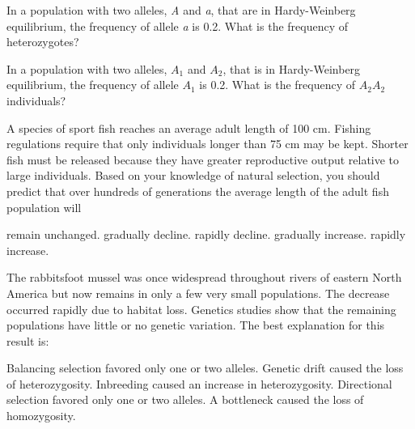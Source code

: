 \question
In a population with two alleles, \textit{A} and \textit{a}, that are in Hardy-Weinberg equilibrium, the frequency of allele \textit{a} is 0.2. What is the frequency of heterozygotes? 

\begin{choices}
\end{choices}

\question
In a population with two alleles, $A_1$ and $A_2$, that is in Hardy-Weinberg equilibrium, the frequency of allele $A_1$ is 0.2. What is the frequency of $A_2A_2$ individuals? 

\begin{choices}
\end{choices}

\question
A species of sport fish reaches an average adult length of 100 cm. Fishing regulations require that only individuals longer than 75 cm may be kept. Shorter fish must be released because they have greater reproductive output relative to large individuals. Based on your knowledge of natural selection, you should predict that over hundreds of generations the average length of the adult fish population will

\begin{choices}
\correctchoice remain unchanged. %
\choice gradually decline. %
\choice rapidly decline. %
\choice gradually increase. %
\choice rapidly increase. %
\end{choices}

\question
The rabbitsfoot mussel was once widespread throughout rivers of eastern North America but now remains in only a few very small populations. The decrease occurred rapidly due to habitat loss. Genetics studies show that the remaining populations have little or no genetic variation. The best explanation for this result is:

\begin{choices}
\choice Balancing selection favored only one or two alleles. %
\correctchoice Genetic drift caused the loss of heterozygosity. %
\choice Inbreeding caused an increase in heterozygosity. %
\choice Directional selection favored only one or two alleles. %
\choice A bottleneck caused the loss of homozygosity. %
\end{choices}

